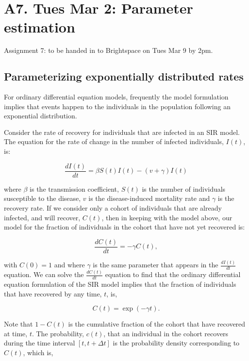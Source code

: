 \documentclass[]{book}
\begin{document}
\chapter{A7. Tues Mar 2: Parameter
estimation}\label{a7.-tues-mar-2-parameter-estimation}

Assignment 7: to be handed in to Brightspace on Tues Mar 9 by 2pm.

\section{Parameterizing exponentially distributed
rates}\label{parameterizing-exponentially-distributed-rates}

For ordinary differential equation models, frequently the model
formulation implies that events happen to the individuals in the
population following an exponential distribution.

Consider the rate of recovery for individuals that are infected in an
SIR model. The equation for the rate of change in the number of infected
individuals, \(I(t)\), is:

\begin{equation}
\frac{dI(t)}{dt} = \beta S(t) I(t) - (v+\gamma)I(t) 
\end{equation}

where \(\beta\) is the transmission coefficient, \(S(t)\) is the number
of individuals susceptible to the disease, \(v\) is the disease-induced
mortality rate and \(\gamma\) is the recovery rate. If we consider only
a cohort of individuals that are already infected, and will recover,
\(C(t)\), then in keeping with the model above, our model for the
fraction of individuals in the cohort that have not yet recovered is:

\begin{equation}
\frac{dC(t)}{dt} = - \gamma C(t), 
\end{equation}

with \(C(0) = 1\) and where \(\gamma\) is the same parameter that
appears in the \(\frac{dI(t)}{dt}\) equation. We can solve the
\(\frac{dC(t)}{dt}\) equation to find that the ordinary differential
equation formulation of the SIR model implies that the fraction of
individuals that have recovered by any time, \(t\), is,

\begin{equation}
C(t) = \exp(-\gamma t). 
\end{equation}

Note that \(1-C(t)\) is the cumulative fraction of the cohort that have
recovered at time, \(t\). The probability, \(c(t)\), that an individual
in the cohort recovers during the time interval \([t, t+\Delta t]\) is
the probability density corresponding to \(C(t)\), which is,
\end{document}
